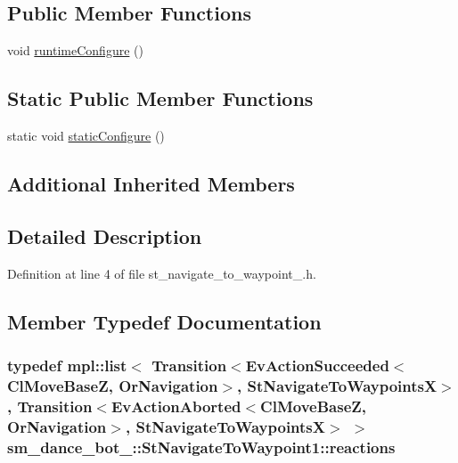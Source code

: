 \subsection*{Public Member Functions}
\begin{DoxyCompactItemize}
\item 
void \hyperlink{structsm__dance__bot__3_1_1StNavigateToWaypoint1_a779a1967647289a1fcba0794411030b3}{runtime\+Configure} ()
\end{DoxyCompactItemize}
\subsection*{Static Public Member Functions}
\begin{DoxyCompactItemize}
\item 
static void \hyperlink{structsm__dance__bot__3_1_1StNavigateToWaypoint1_aacdce3db32451c1fa7816693d819e8a9}{static\+Configure} ()
\end{DoxyCompactItemize}
\subsection*{Additional Inherited Members}


\subsection{Detailed Description}


Definition at line 4 of file st\+\_\+navigate\+\_\+to\+\_\+waypoint\+\_.\+h.



\subsection{Member Typedef Documentation}
\subsubsection[{\texorpdfstring{reactions}{reactions}}]{\setlength{\rightskip}{0pt plus 5cm}typedef mpl\+::list$<$ Transition$<$Ev\+Action\+Succeeded$<${\bf Cl\+Move\+BaseZ}, {\bf Or\+Navigation}$>$, {\bf St\+Navigate\+To\+WaypointsX}$>$, Transition$<$Ev\+Action\+Aborted$<${\bf Cl\+Move\+BaseZ}, {\bf Or\+Navigation}$>$, {\bf St\+Navigate\+To\+WaypointsX}$>$ $>$ {\bf sm\+\_\+dance\+\_\+bot\+\_\+::\+St\+Navigate\+To\+Waypoint1\+::reactions}}\hypertarget{structsm__dance__bot__3_1_1StNavigateToWaypoint1_a8baf82b2287fdb1d80b8de5e5502c2a5}{}\label{structsm__dance__bot__3_1_1StNavigateToWaypoint1_a8baf82b2287fdb1d80b8de5e5502c2a5}


